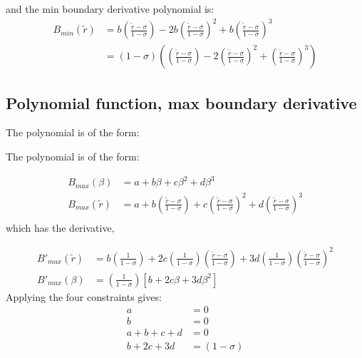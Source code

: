 \documentclass[a4paper]{article}
\begin{document}
and the min boundary derivative polynomial is: 
\begin{align*}
    B_{min}\left( \widetilde{r} \right) &= 
    b \left( \frac{\widetilde{r} - \sigma }{1 - \sigma}\right) -
    2b\left( \frac{\widetilde{r} - \sigma }{1 - \sigma}\right) ^2 +
    b \left( \frac{\widetilde{r} - \sigma }{1 - \sigma}\right)^3 \\
    &=  \left( 1 - \sigma \right)
    \left( \left( \frac{\widetilde{r} - \sigma }{1 - \sigma}\right)  - 
    2\left( \frac{\widetilde{r} - \sigma }{1 - \sigma}\right)^2 +
    \left( \frac{\widetilde{r} - \sigma }{1 - \sigma}\right)^3\right)
\end{align*} 
\subsection{Polynomial function, max boundary derivative}
The polynomial is of the form:

The polynomial is of the form: 

\begin{align*}
    B_{max} \left( \beta \right) &= 
    a + b \beta + c \beta^2 + d \beta^3                   \\
    B_{max} \left( \widetilde{r} \right) &= 
    a + b \left( \frac{\widetilde{r} - \sigma}{1 - \sigma} \right)+
    c\left( \frac{\widetilde{r} - \sigma}{1 - \sigma} \right)  ^2+
    d\left( \frac{\widetilde{r} - \sigma}{1 - \sigma} \right)^3                    \\
\end{align*}
which has the derivative,


\begin{align*}
    B'_{max} \left( \widetilde{r} \right) &= 
    b \left( \frac{1}{1 - \sigma} \right)+
    2 c\left( \frac{1}{1 - \sigma} \right)\left( \frac{\widetilde{r} - \sigma}{1 - \sigma} \right)  +
    3 d\left( \frac{1}{1-\sigma} \right)\left( \frac{\widetilde{r} - \sigma}{1 - \sigma} \right)^2\\
    B'_{max} \left( \beta \right) &= 
    \left( \frac{1}{1 - \sigma} \right)
    \left[
    b +
    2 c \beta + 
    3 d \beta^2
    \right]
\end{align*}
Applying the four constraints gives:
\begin{align*}
    a &= 0 \\
    b &= 0 \\
    a + b + c + d &= 0 \\
    b + 2c + 3d &= (1-\sigma)
\end{align*} 
\end{document}
